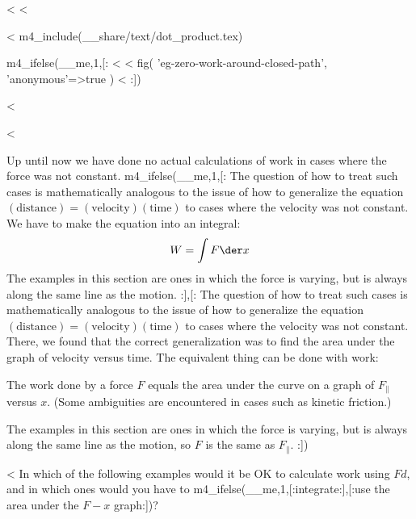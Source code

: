   <%
<%

<%
  m4_include(__share/text/dot_product.tex)

m4_ifelse(__me,1,[:
<%
<%
  fig(
    'eg-zero-work-around-closed-path',
    {'anonymous'=>true}
  )
<%
:])

<%


<%

Up until now we have done no actual calculations of work in
cases where the force was not constant. 
m4_ifelse(__me,1,[:%
The question of how
to treat such cases is mathematically analogous to the issue
of how to generalize the equation 
$(\text{distance})=(\text{velocity})(\text{time})$
to cases where the velocity was not constant. We have to make
the equation into an integral:
\begin{equation*}
  W = \int F \der x
\end{equation*}
The examples in this section are ones in which the force is
varying, but is always along the same line as the motion.
:],[:%
The question of how
to treat such cases is mathematically analogous to the issue
of how to generalize the equation 
$(\text{distance})=(\text{velocity})(\text{time})$
to cases where the velocity was not constant. There, we
found that the correct generalization was to find the area
under the graph of velocity versus time. The equivalent
thing can be done with work:

\begin{lessimportant}
The work done by a force $F$ equals the area under the curve
on a graph of $F_{\parallel}$ versus $x$. (Some ambiguities are
encountered in cases such as kinetic friction.)
\end{lessimportant}
The examples in this section are ones in which the force is
varying, but is always along the same line as the motion, so
$F$ is the same as $F_{\parallel}$.
:])

<%
In which of the following examples would it be OK to
calculate work using $Fd$, and in which ones would you
have to m4_ifelse(__me,1,[:integrate:],[:use the area under the $F-x$ graph:])?

